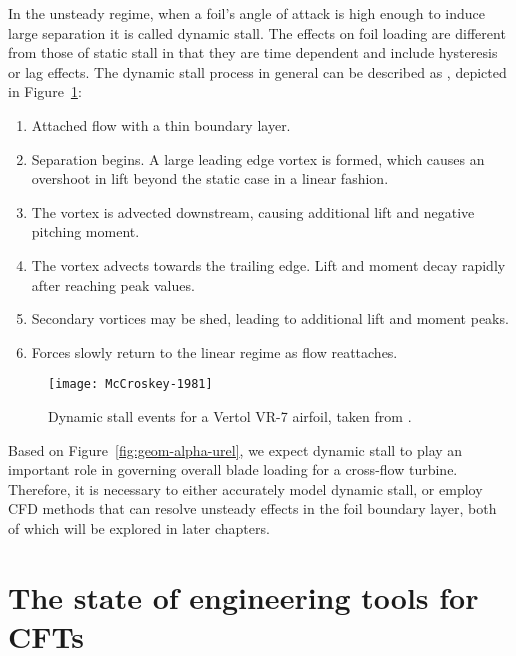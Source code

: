 In the unsteady regime, when a foil's angle of attack is high enough to induce
large separation it is called dynamic stall. The effects on foil loading are
different from those of static stall in that they are time dependent and include
hysteresis or lag effects. The dynamic stall process in general can be described
as \cite{McCroskey1981}, depicted in Figure~\ref{fig:McCroskey}:
\begin{enumerate}
    \item Attached flow with a thin boundary layer.

    \item Separation begins. A large leading edge vortex is formed, which causes
    an overshoot in lift beyond the static case in a linear fashion.
    
    \item The vortex is advected downstream, causing additional lift and
    negative pitching moment.
    
    \item The vortex advects towards the trailing edge. Lift and moment decay
    rapidly after reaching peak values.
    
    \item Secondary vortices may be shed, leading to additional lift and moment
    peaks.
    
    \item Forces slowly return to the linear regime as flow reattaches.
\end{enumerate}

\begin{figure}
    \centering
    
    \texttt{[image: McCroskey-1981]}
    
    \caption{Dynamic stall events for a Vertol VR-7 airfoil, taken from
        \cite{McCroskey1981}.}

    \label{fig:McCroskey}
\end{figure}

Based on Figure~\ref{fig:geom-alpha-urel}, we expect dynamic stall to play an
important role in governing overall blade loading for a cross-flow turbine.
Therefore, it is necessary to either accurately model dynamic stall, or employ
CFD methods that can resolve unsteady effects in the foil boundary layer, both
of which will be explored in later chapters.


\section{The state of engineering tools for CFTs}

